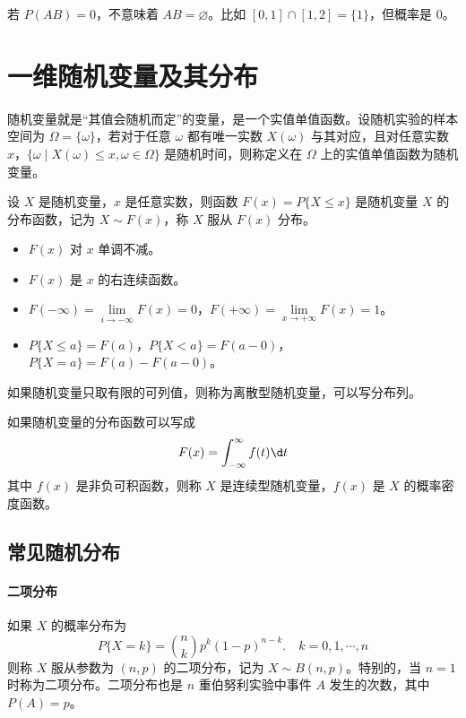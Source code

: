 \begin{note}
	若 $P(AB) = 0$，不意味着 $AB = \varnothing$。比如 $[0,1]\cap [1,2] = \{1\}$，但概率是 $0$。
\end{note}

\section{一维随机变量及其分布}

随机变量就是“其值会随机而定”的变量，是一个实值单值函数。设随机实验的样本空间为 $\Omega = \{\omega\}$，若对于任意 $\omega$ 都有唯一实数 $X(\omega)$ 与其对应，且对任意实数 $x$，$\{\omega \mid X(\omega) \leqslant x, \omega \in \Omega\}$ 是随机时间，则称定义在 $\Omega$ 上的实值单值函数为随机变量。

设 $X$ 是随机变量，$x$ 是任意实数，则函数 $F(x) = P\{X \leqslant x\}$ 是随机变量 $X$ 的分布函数，记为 $X \sim F(x)$，称 $X$ 服从 $F(x)$ 分布。

\begin{itemize}
	\item $F(x)$ 对 $x$ 单调不减。
	\item $F(x)$ 是 $x$ 的右连续函数。
	\item $F(- \infty) = \lim\limits_{i \to -\infty} F(x) = 0$，$F(+\infty) = \lim\limits_{x \to + \infty} F(x) = 1$。 
	\item $P\{X \leqslant a\} = F(a)$，$P\{X < a\} = F(a - 0)$，$P\{X = a\} = F(a) - F(a - 0)$。
\end{itemize}

如果随机变量只取有限的可列值，则称为离散型随机变量，可以写分布列。

如果随机变量的分布函数可以写成
\[ F(x) = \int_{-\infty}^{\infty} f(t) \d t \]
其中 $f(x)$ 是非负可积函数，则称 $X$ 是连续型随机变量，$f(x)$ 是 $X$ 的概率密度函数。

\subsection{常见随机分布}

\paragraph{二项分布}
如果 $X$ 的概率分布为
\[ P\{X = k\} = \binom{n}{k} p^k(1 - p)^{n-k}. \quad k = 0, 1, \cdots, n \]
则称 $X$ 服从参数为 $(n, p)$ 的二项分布，记为 $X \sim B(n, p)$。特别的，当 $n=1$ 时称为二项分布。二项分布也是 $n$ 重伯努利实验中事件 $A$ 发生的次数，其中 $P(A) = p$。

